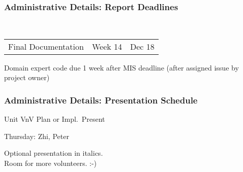 \documentclass[t,12pt,numbers,fleqn]{beamer}
\begin{document}



\begin{frame}
\frametitle{Administrative Details: Report Deadlines}
~\newline
\begin{tabular}{l l l}
Final Documentation & Week 14 & Dec 18\\
\end {tabular}

\bi
\item Domain expert code due 1 week after MIS deadline (after assigned issue by
  project owner)
\ei

\end{frame}


\begin{frame}
\frametitle{Administrative Details: Presentation Schedule}

\bi
\item Unit VnV Plan or Impl.\ Present
\bi
\item Thursday: Zhi, Peter
\ei
\ei

Optional presentation in italics.\\
Room for more volunteers.  :-)

\end{frame}

\end{document}
